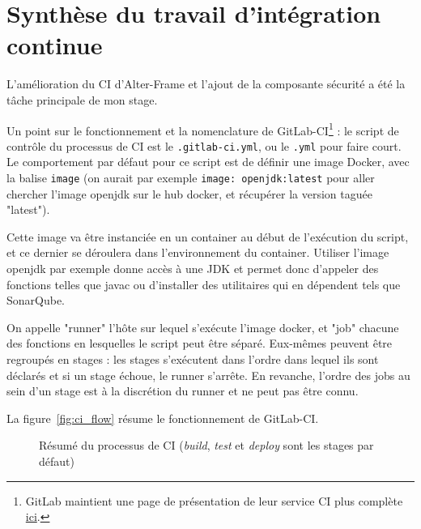 \section{Synthèse du travail d'intégration continue}
\label{sec:synthese_ci}
L'amélioration du CI d'Alter-Frame et l'ajout de la composante sécurité a été la tâche principale de mon stage.

Un point sur le fonctionnement et la nomenclature de GitLab-CI\footnote{GitLab maintient une page de présentation de leur service CI plus complète \href{https://about.gitlab.com/2016/10/25/gitlab-workflow-an-overview/}{ici}.} : le script de contrôle du processus de CI est le \texttt{.gitlab-ci.yml}, ou le \texttt{.yml} pour faire court. Le comportement par défaut pour ce script est de définir une image Docker, avec la balise \texttt{image} (on aurait par exemple \texttt{image: openjdk:latest} pour aller chercher l'image openjdk sur le hub docker, et récupérer la version taguée "latest").

Cette image va être instanciée en un container au début de l'exécution du script, et ce dernier se déroulera dans l'environnement du container. Utiliser l'image openjdk par exemple donne accès à une JDK et permet donc d'appeler des fonctions telles que javac ou d'installer des utilitaires qui en dépendent tels que SonarQube. 

On appelle "runner" l'hôte sur lequel s'exécute l'image docker, et "job" chacune des fonctions en lesquelles le script peut être séparé. Eux-mêmes peuvent être regroupés en stages : les stages s'exécutent dans l'ordre dans lequel ils sont déclarés et si un stage échoue, le runner s'arrête. En revanche, l'ordre des jobs au sein d'un stage est à la discrétion du runner et ne peut pas être connu. 

La figure~\ref{fig:ci_flow} résume le fonctionnement de GitLab-CI. 

\begin{figure}
	\centering
	\caption{Résumé du processus de CI (\emph{build}, \emph{test} et \emph{deploy} sont les stages par défaut)}
	\label{fig:ci_process}
\end{figure}

